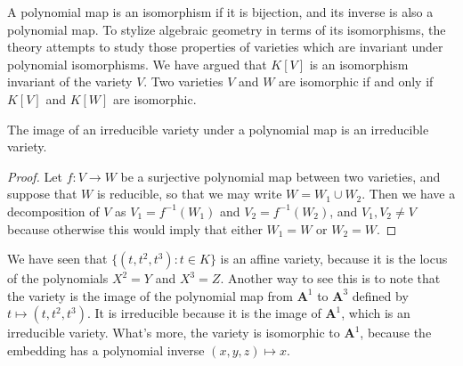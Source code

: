 A polynomial map is an isomorphism if it is bijection, and its inverse is also a polynomial map. To stylize algebraic geometry in terms of its isomorphisms, the theory attempts to study those properties of varieties which are invariant under polynomial isomorphisms. We have argued that $K[V]$ is an isomorphism invariant of the variety $V$. Two varieties $V$ and $W$ are isomorphic if and only if $K[V]$ and $K[W]$ are isomorphic.

\begin{prop}
    The image of an irreducible variety under a polynomial map is an irreducible variety.
\end{prop}
\begin{proof}
    Let $f: V \to W$ be a surjective polynomial map between two varieties, and suppose that $W$ is reducible, so that we may write $W = W_1 \cup W_2$. Then we have a decomposition of $V$ as $V_1 = f^{-1}(W_1)$ and $V_2 = f^{-1}(W_2)$, and $V_1, V_2 \neq V$ because otherwise this would imply that either $W_1 = W$ or $W_2 = W$.
\end{proof}

\begin{example}
    We have seen that $\{ (t,t^2,t^3): t \in K \}$ is an affine variety, because it is the locus of the polynomials $X^2 = Y$ and $X^3 = Z$. Another way to see this is to note that the variety is the image of the polynomial map from $\mathbf{A}^1$ to $\mathbf{A}^3$ defined by $t \mapsto (t,t^2,t^3)$. It is irreducible because it is the image of $\mathbf{A}^1$, which is an irreducible variety. What's more, the variety is isomorphic to $\mathbf{A}^1$, because the embedding has a polynomial inverse $(x,y,z) \mapsto x$.
\end{example}

